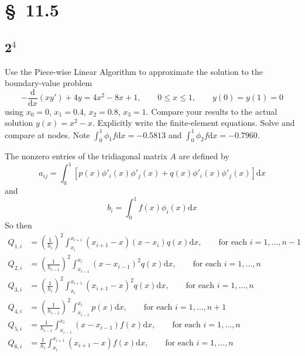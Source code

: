 \documentclass[12pt]{article}
\newcommand{\dd}[1]{\mathrm{d}{#1}}
\newcommand{\ddt}[1]{\frac{\dd{}}{\dd{#1}}}
\begin{document}
\section{\S~11.5}
\subsection{2$^4$}
Use the Piece-wise Linear Algorithm to approximate the solution to the
boundary-value problem 
$$ -\ddt{x}(xy')+4y=4x^2-8x+1,\qquad 0\leq x\leq1,\qquad
y(0)=y(1)=0 $$ using $x_0=0$, $x_1=0.4$, $x_2=0.8$, $x_3=1$. Compare
your results to the actual solution $y(x)=x^2-x$. Explicitly write the
finite-element equations. Solve and compare at nodes. Note $\int_0^1\phi_1 f
\dd{x} = -0.5813$ and $\int_0^1\phi_2 f \dd{x} = -0.7960$.

The nonzero entries of the tridiagonal matrix $A$ are defined by 
\begin{equation}
  \label{eq:piecewise-general-a}
  a_{ij} = \int_0^1[p(x)\phi'_i(x)\phi'_j(x)+q(x)\phi'_i(x)\phi'_j(x)]\dd{x}
\end{equation}
and
\begin{equation}
  \label{eq:piecewise-general-b}
  b_i = \int_0^1f(x)\phi_i(x)\dd{x}
\end{equation}
So then 
\begin{equation}
  \begin{aligned}
    Q_{1,i}&=\left(\frac{1}{h_{i}}\right)^2\int_{x_i}^{x_{i+1}}(x_{i+1}-x)(x-x_{i})q(x)\dd{x},
    \qquad \text{for each }i=1,\ldots,n-1 \\
    Q_{2,i}&=\left(\frac{1}{h_{i-1}}\right)^2\int_{x_{i-1}}^{x_{i}}(x-x_{i-1})^2q(x)\dd{x},
    \qquad \text{for each }i=1,\ldots,n \\
    Q_{3,i}&=\left(\frac{1}{h_{i}}\right)^2\int_{x_i}^{x_{i+1}}(x_{i+1}-x)^2q(x)\dd{x},
    \qquad \text{for each }i=1,\ldots,n \\
    Q_{4,i}&=\left(\frac{1}{h_{i-1}}\right)^2\int_{x_{i-1}}^{x_{i}}p(x)\dd{x},
    \qquad \text{for each }i=1,\ldots,n+1 \\
    Q_{5,i}&=\frac{1}{h_{i-1}}\int_{x_{i-1}}^{x_{i}}(x-x_{i-1})f(x)\dd{x},
    \qquad \text{for each }i=1,\ldots,n \\
    Q_{6,i}&=\frac{1}{h_{i}}\int_{x_i}^{x_{i+1}}(x_{i+1}-x)f(x)\dd{x},
    \qquad \text{for each }i=1,\ldots,n \\
  \end{aligned}
\end{equation}
\end{document}
